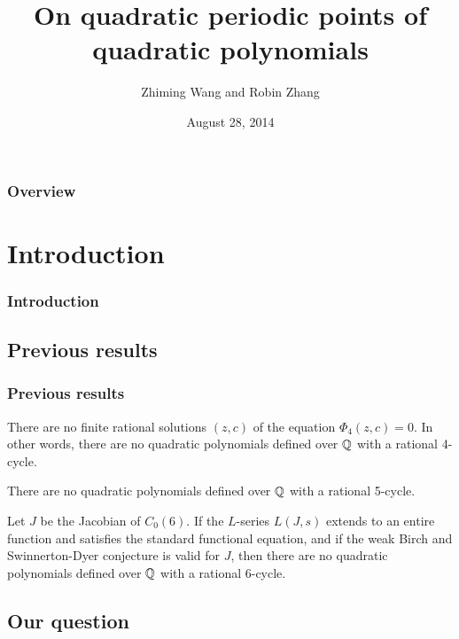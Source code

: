 \documentclass[aspectratio=1610]{beamer}
\title[Quadratic periodic points]%
{On quadratic periodic points of quadratic polynomials}
\author{Zhiming Wang and Robin Zhang} %
\institute[Stanford]
{
Stanford University\\
\medskip
\textit{zmwang@stanford.edu}\\
\textit{robinz16@stanford.edu}
}
\date{August 28, 2014}
\begin{document}
\begin{frame}
  \titlepage
\end{frame}

\begin{frame}
  \frametitle{Overview}
  \tableofcontents
\end{frame}


\fontsize{8pt}{9.6}\selectfont

\section{Introduction}

\begin{frame}
  \frametitle{Introduction}
\end{frame}

\subsection{Previous results}

\begin{frame}
  \frametitle{Previous results}
  \begin{theorem}
    There are no finite rational solutions $(z, c)$ of the equation
    $\Phi_4(z, c) = 0$. In other words, there are no quadratic
    polynomials defined over $\mathbb{Q}$ with a rational 4-cycle.
  \end{theorem}

  \begin{theorem}
    There are no quadratic polynomials defined over $\mathbb{Q}$ with a
    rational 5-cycle.
  \end{theorem}

  \begin{theorem}
    Let $J$ be the Jacobian of $C_0(6)$. If the $L$-series $L(J,s)$
    extends to an entire function and satisfies the standard
    functional equation, and if the weak Birch and Swinnerton-Dyer
    conjecture is valid for $J$, then there are no quadratic
    polynomials defined over $\mathbb{Q}$ with a rational 6-cycle.
  \end{theorem}
\end{frame}

\subsection{Our question}
\end{document}
